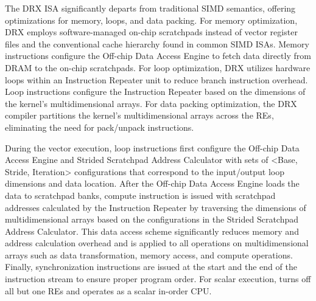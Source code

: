 %
%
The DRX ISA significantly departs from traditional SIMD semantics, offering optimizations for memory, loops, and data packing. 
%
For memory optimization, DRX employs software-managed on-chip scratchpads instead of vector register files and the conventional cache hierarchy found in common SIMD ISAs. 
%
Memory instructions configure the Off-chip Data Access Engine to fetch data directly from DRAM to the on-chip scratchpads. 
%
For loop optimization, DRX utilizes hardware loops within an Instruction Repeater unit to reduce branch instruction overhead. 
%
Loop instructions configure the Instruction Repeater based on the dimensions of the kernel's multidimensional arrays. 
%
For data packing optimization, the DRX compiler partitions the kernel's multidimensional arrays across the REs, eliminating the need for pack/unpack instructions.


During the vector execution, loop instructions first configure the Off-chip Data Access Engine and Strided Scratchpad Address Calculator with sets of <Base, Stride, Iteration> configurations that correspond to the input/output loop dimensions and data location. 
%
After the Off-chip Data Access Engine loads the data to scratchpad banks, compute instruction is issued with scratchpad addresses calculated by the Instruction Repeater by traversing the dimensions of multidimensional arrays based on the configurations in the Strided Scratchpad Address Calculator. 
%
This data access scheme significantly reduces memory and address calculation overhead and is applied to all operations on multidimensional arrays such as data transformation, memory access, and compute operations. 
%
Finally, synchronization instructions are issued at the start and the end of the instruction stream to ensure proper program order. For scalar execution, \drx turns off all but one REs and operates as a scalar in-order CPU. 


